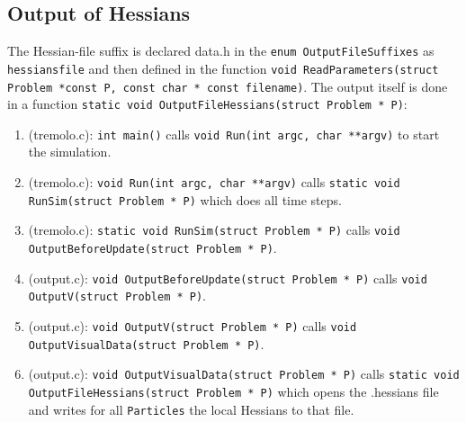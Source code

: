 \documentclass[11pt]{article}
\begin{document}
\subsection{Output of Hessians}
\label{sec-1-5}
The Hessian-file suffix is declared data.h in the \texttt{enum OutputFileSuffixes} as \texttt{hessiansfile} and then defined in the function \texttt{void ReadParameters(struct Problem *const P, const char * const filename)}.
The output itself is done in a function \texttt{static void OutputFileHessians(struct Problem * P)}:
\begin{enumerate}
\item (tremolo.c): \texttt{int main()} calls \texttt{void Run(int argc, char **argv)} to start the simulation.
\item (tremolo.c): \texttt{void Run(int argc, char **argv)} calls \texttt{static void RunSim(struct Problem * P)} which does all time steps.
\item (tremolo.c): \texttt{static void RunSim(struct Problem * P)} calls \texttt{void OutputBeforeUpdate(struct Problem * P)}.
\item (output.c): \texttt{void OutputBeforeUpdate(struct Problem * P)} calls \texttt{void OutputV(struct Problem * P)}.
\item (output.c): \texttt{void OutputV(struct Problem * P)} calls \texttt{void OutputVisualData(struct Problem * P)}.
\item (output.c): \texttt{void OutputVisualData(struct Problem * P)} calls \texttt{static void OutputFileHessians(struct Problem * P)} which opens the .hessians file and writes for all \texttt{Particles} the local Hessians to that file.
\end{enumerate}
\end{document}
